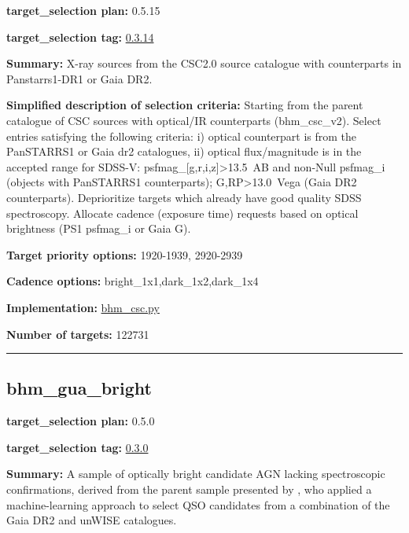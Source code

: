\noindent\textbf{target\_selection plan:} 0.5.15

\noindent\textbf{target\_selection tag:}
\href{https://github.com/sdss/target_selection/tree/0.3.14/}{0.3.14}

\noindent\textbf{Summary:} X-ray sources from the CSC2.0 source catalogue with
counterparts in Panstarrs1-DR1 or Gaia DR2.

\noindent\textbf{Simplified description of selection criteria:} Starting from the
parent catalogue of CSC sources with optical/IR counterparts
(bhm\_csc\_v2). Select entries satisfying the following criteria: i)
optical counterpart is from the PanSTARRS1 or Gaia dr2 catalogues, ii)
optical flux/magnitude is in the accepted range for SDSS-V:
psfmag\_{[}g,r,i,z{]}\textgreater{}13.5~AB and non-Null psfmag\_i
(objects with PanSTARRS1 counterparts); G,RP\textgreater{}13.0~Vega
(Gaia DR2 counterparts). Deprioritize targets which already have good
quality SDSS spectroscopy. Allocate cadence (exposure time) requests
based on optical brightness (PS1 psfmag\_i or Gaia G).


\noindent\textbf{Target priority options:} 1920-1939, 2920-2939

\noindent\textbf{Cadence options:} bright\_1x1,dark\_1x2,dark\_1x4

\noindent\textbf{Implementation:}
\href{https://github.com/sdss/target_selection/blob/0.3.14/python/target_selection/cartons/bhm_csc.py}{bhm\_csc.py}

\noindent\textbf{Number of targets:} 122731

\begin{center}\rule{0.5\linewidth}{0.5pt}\end{center}

\hypertarget{bhm_gua_bright_plan0.5.0}{%
\subsection{bhm\_gua\_bright}\label{bhm_gua_bright_plan0.5.0}}

\noindent\textbf{target\_selection plan:} 0.5.0

\noindent\textbf{target\_selection tag:}
\href{https://github.com/sdss/target_selection/tree/0.3.0/}{0.3.0}

\noindent\textbf{Summary:} A sample of optically bright candidate AGN lacking
spectroscopic confirmations, derived from the parent sample presented by
\citet{Shu2019}, who applied a machine-learning approach to select QSO
candidates from a combination of the Gaia DR2 and unWISE catalogues.

